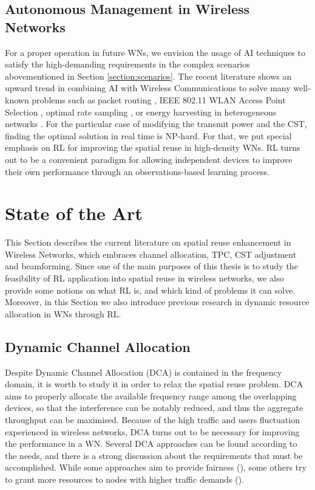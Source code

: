 \documentclass[12pt, a4paper,twoside]{tesi_upf}
\begin{document}
		\section{Autonomous Management in Wireless Networks}
		\label{section:rl_vision}
			For a proper operation in future WNs, we envision the usage of AI techniques to satisfy the high-demanding requirements in the complex scenarios abovementioned in Section \ref{section:scenarios}. The recent literature shows an upward trend in combining AI with Wireless Communications to solve many well-known problems such as packet routing \cite{littman1993distributed}, IEEE 802.11 WLAN Access Point Selection \cite{bojovic2011supervised, bojovic2012neural}, optimal rate sampling \cite{combes2014optimal}, or energy harvesting in heterogeneous networks \cite{miozzo2015distributed}. For the particular case of modifying the transmit power and the CST, finding the optimal solution in real time is NP-hard. For that, we put special emphasis on RL for improving the spatial reuse in high-density WNs. RL turns out to be a convenient paradigm for allowing independent devices to improve their own performance through an observations-based learning process.
			
	\chapter{State of the Art}
	\label{section:state_of_the_art}
		This Section describes the current literature on spatial reuse enhancement in Wireless Networks, which embraces channel allocation, TPC, CST adjustment and beamforming. Since one of the main purposes of this thesis is to study the feasibility of RL application into spatial reuse in wireless networks, we also provide some notions on what RL is, and which kind of problems it can solve. Moreover, in this Section we also introduce previous research in dynamic resource allocation in WNs through RL. 
			
		\section{Dynamic Channel Allocation}		
		\label{section:dca}					
			Despite Dynamic Channel Allocation (DCA) is contained in the frequency domain, it is worth to study it in order to relax the spatial reuse problem. DCA aims to properly allocate the available frequency range among the overlapping devices, so that the interference can be notably reduced, and thus the aggregate throughput can be maximised. Because of the high traffic and users fluctuation experienced in wireless networks, DCA turns out to be necessary for improving the performance in a WN. Several DCA approaches can be found according to the needs, and there is a strong discussion about the requirements that must be accomplished. While some approaches aim to provide fairness (\cite{ling2006joint}), some others try to grant more resources to nodes with higher traffic demands (\cite{wertz2004automatic}). 	
		
\end{document}
